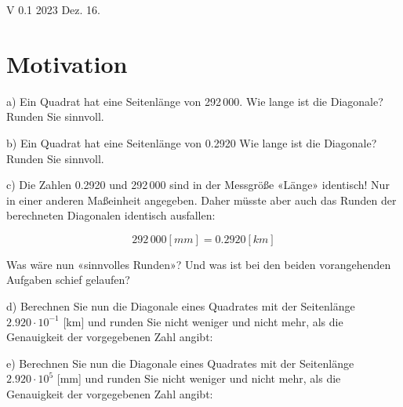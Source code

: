 
\renewcommand{\bbwAufgabenBlockID}{A1rnd}


\usepackage{amssymb} %
\renewcommand{\metaHeaderLine}{Arbeitsblatt}
\renewcommand{\arbeitsblattTitel}{Runden}

\arbeitsblattHeader{}

\begin{center}V 0.1 2023 Dez. 16.\end{center}


\section{Motivation}

a) Ein Quadrat hat eine Seitenlänge von 292\,000. Wie lange ist die
Diagonale? Runden Sie sinnvoll.


b) Ein Quadrat hat eine Seitenlänge von 0.2920  Wie lange ist die
Diagonale? Runden Sie sinnvoll.


c) 
Die Zahlen 0.2920 und 292\,000 sind in der Messgröße «Länge» identisch! Nur in einer anderen
Maßeinheit angegeben. Daher müsste aber auch
das Runden der berechneten Diagonalen identisch ausfallen:

$$292\,000 [mm] = 0.2920 [km]$$

Was wäre nun «sinnvolles Runden»? Und was ist bei den beiden
vorangehenden Aufgaben schief gelaufen?


d) Berechnen Sie nun die Diagonale eines Quadrates mit der Seitenlänge
$2.920\cdot{}10^{-1}$ [km] und runden Sie nicht weniger und nicht
mehr, als die Genauigkeit der vorgegebenen Zahl angibt:



e) Berechnen Sie nun die Diagonale eines Quadrates mit der Seitenlänge
$2.920\cdot{}10^{5}$ [mm] und runden Sie nicht weniger und nicht
mehr, als die Genauigkeit der vorgegebenen Zahl angibt:

